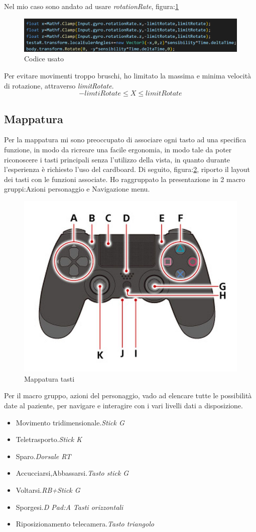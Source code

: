 \documentclass[
a4paper,
cleardoublepage=empty,
headings=twolinechapter,
numbers=autoenddot,
]{scrbook}
\begin{document}
	Nel mio caso sono andato ad usare \textit{rotationRate}, figura:\ref{fig:code_giro}
	\begin{figure}[H]
		\centering
		\includegraphics[width=1\linewidth]{image/codice_giro}
		\caption{Codice usato}
		\label{fig:code_giro}
	\end{figure}
	Per evitare movimenti troppo bruschi, ho limitato la massima e minima velocità di rotazione, attraverso \textit{limitRotate}.
	\begin{displaymath}
		-limtiRotate  \leq X \leq limitRotate
	\end{displaymath}
	\subsection{Mappatura}
	Per la mappatura mi sono preoccupato di associare ogni tasto ad una specifica funzione, in modo da ricreare una facile ergonomia, in modo tale da poter riconoscere i tasti principali senza l'utilizzo della vista, in quanto durante l'esperienza è richiesto l'uso del cardboard.
	Di seguito, figura:\ref{fig:gamepad_tasti}, riporto il layout dei tasti con le funzioni associate.
	Ho raggruppato la presentazione in 2 macro gruppi:Azioni personaggio e Navigazione menu.
	\begin{figure}[H]
		\centering
		\includegraphics[width=0.6\linewidth]{image/gamepad_tasti}
		\caption{Mappatura tasti}
		\label{fig:gamepad_tasti}
	\end{figure}
	Per il macro gruppo, azioni del personaggio, vado ad elencare tutte le possibilità date al paziente, per navigare e interagire con i vari livelli dati a disposizione.
	\begin{itemize}
		\item Movimento tridimensionale.\textit{Stick G}
		\item Teletrasporto.\textit{Stick K}
		\item Sparo.\textit{Dorsale RT}
		\item Accucciarsi,Abbassarsi.\textit{Tasto stick G}
		\item Voltarsi.\textit{RB+Stick G}
		\item Sporgesi.\textit{D Pad:A Tasti orizzontali}
		\item Riposizionamento telecamera.\textit{Tasto triangolo}
	\end{itemize}
\end{document}

